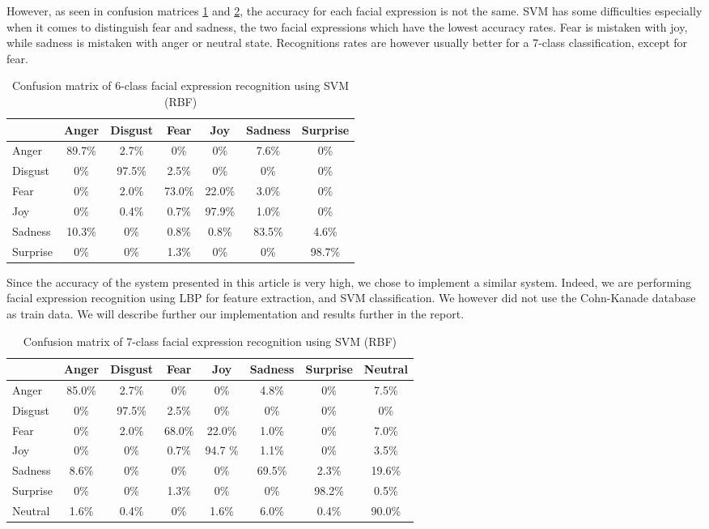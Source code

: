 \noindent However, as seen in confusion matrices \ref{conf_mtx_6_svm_lbp} and \ref{conf_mtx_7_svm_lbp}, the accuracy for each facial expression is not the same. SVM has some difficulties especially when it comes to distinguish fear and sadness, the two facial expressions which have the lowest accuracy rates. Fear is mistaken with joy, while sadness is mistaken with anger or neutral state. Recognitions rates are however usually better for a 7-class classification, except for fear.
\newline

\begin{table}[h]
\begin{tabular}{|lcccccc|}
\hline
 & Anger & Disgust & Fear & Joy & Sadness & Surprise \\
\hline
Anger & 89.7\% & 2.7\% & 0\% & 0\% & 7.6\% & 0\% \\
Disgust & 0\% & 97.5\% & 2.5\% & 0\% & 0\% & 0\% \\
Fear & 0\% & 2.0\% & 73.0\% & 22.0\% & 3.0\% & 0\% \\
Joy & 0\% & 0.4\% & 0.7\% & 97.9\% & 1.0\% & 0\% \\
Sadness & 10.3\% & 0\% & 0.8\% & 0.8\% & 83.5\% & 4.6\% \\
Surprise & 0\% & 0\% & 1.3\% & 0\% & 0\% & 98.7\% \\
\hline
\end{tabular}
\caption{\label{conf_mtx_6_svm_lbp} Confusion matrix of 6-class facial expression recognition using SVM (RBF)}
\end{table}

\noindent Since the accuracy of the system presented in this article is very high, we chose to implement a similar system. Indeed, we are performing facial expression recognition using LBP for feature extraction, and SVM classification. We however did not use the Cohn-Kanade database as train data. We will describe further our implementation and results further in the report. 
\newline

\begin{table}[h]
\begin{tabular}{|lccccccc|}
\hline
& Anger & Disgust & Fear & Joy & Sadness & Surprise & Neutral \\
\hline
Anger & 85.0\% & 2.7\% & 0\% & 0\% & 4.8\% & 0\% & 7.5\% \\
Disgust & 0\% & 97.5\% & 2.5\% & 0\% & 0\% & 0\% & 0\% \\
Fear & 0\% & 2.0\% & 68.0\% & 22.0\% & 1.0\% & 0\% & 7.0\% \\
Joy & 0\% & 0\% & 0.7\% & 94.7 \% & 1.1\% & 0\% & 3.5\% \\
Sadness & 8.6\% & 0\% & 0\% & 0\% & 69.5\% & 2.3\% & 19.6\% \\
Surprise & 0\% & 0\% & 1.3\% & 0\% & 0\% & 98.2\% & 0.5\% \\
Neutral & 1.6\% & 0.4\% & 0\% & 1.6\% & 6.0\% & 0.4\% & 90.0\% \\
\hline
\end{tabular}
\caption{\label{conf_mtx_7_svm_lbp} Confusion matrix of 7-class facial expression recognition using SVM (RBF)}
\end{table}
\clearpage
